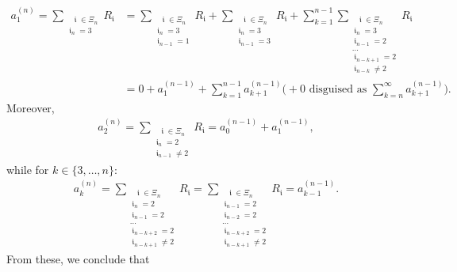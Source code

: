 \documentclass[a4paper, 11pt]{article}
\DeclareMathOperator{\iii}{\mathfrak{i}}
\numberwithin{equation}{section}
\theoremstyle{plain}
\theoremstyle{remark}
\theoremstyle{definition}
\begin{document}
\begin{equation*}\begin{aligned}
a_1^{(n)} = \sum_{\substack{\ \ \ \iii \in \Xi_n \\ \iii_n = 3}} R_{\iii} &= \sum_{\substack{\ \ \ \iii \in \Xi_n \\ \iii_n = 3 \\ \iii_{n-1} = 1}} R_{\iii} + \sum_{\substack{\ \ \ \iii \in \Xi_n \\ \iii_n = 3 \\ \iii_{n-1} = 3}} R_{\iii} + \sum_{k=1}^{n-1}\sum_{\substack{\ \ \ \iii \in \Xi_n \\ \iii_n = 3 \\ \iii_{n-1} = 2 \\ \dots \\ \iii_{n-k+1} = 2 \\ \iii_{n-k} \neq 2}} R_{\iii} \\
&= 0 + a_1^{(n-1)} + \sum_{k=1}^{n-1} a_{k+1}^{(n-1)} \Big(+ 0 \text{ disguised as } \sum_{k=n}^{\infty} a_{k+1}^{(n-1)} \Big).
\end{aligned}\end{equation*}
Moreover,
\begin{equation*}\begin{aligned}
a_2^{(n)} = \sum_{\substack{\ \ \ \iii \in \Xi_n \\ \iii_n = 2 \\ \iii_{n-1} \neq 2}} R_{\iii} = a_{0}^{(n-1)} + a_{1}^{(n-1)},
\end{aligned}\end{equation*}
while for $k \in \{3,\dots,n\}$:
\begin{equation*}\begin{aligned}
a_k^{(n)} = \sum_{\substack{\ \ \ \iii \in \Xi_n \\ \iii_n = 2 \\ \iii_{n-1} = 2 \\ \dots \\ \iii_{n-k+2} = 2 \\ \iii_{n-k+1} \neq 2}} R_{\iii} = \sum_{\substack{\ \ \ \iii \in \Xi_n \\ \iii_{n-1} = 2 \\ \iii_{n-2} = 2 \\ \dots \\ \iii_{n-k+2} = 2 \\ \iii_{n-k+1} \neq 2}} R_{\iii} = a_{k-1}^{(n-1)}.
\end{aligned}\end{equation*}
From these, we conclude that
\end{document}
